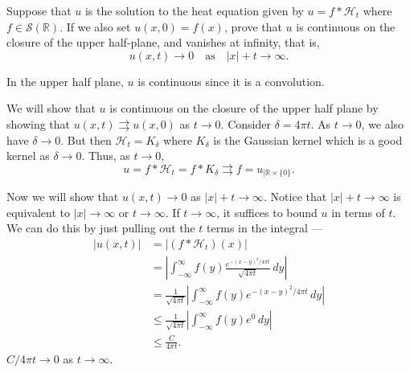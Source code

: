 \documentclass[12 pt, letterpaper]{hmcpset}
\begin{document}
\begin{problem}[S \& S \S 5.5 \#11]
	Suppose that $u$ is the solution to the heat equation given by $u = f * \mathcal{H}_{t}$ where $f \in \mathcal{S}(\mathbb{R})$. If we also set $u(x, 0) = f(x)$, prove that $u$ is continuous on the closure of the upper half-plane, and vanishes at infinity, that is,
	\[
		u(x, t) \to 0 \quad \text{as} \quad \lvert x \rvert + t \to \infty.
	\]
\end{problem}

\begin{solution}
	In the upper half plane, $u$ is continuous since it is a convolution.

	We will show that $u$ is continuous on the closure of the upper half plane by showing that $u(x, t) \rightrightarrows u(x, 0)$ as $t \to 0$. Consider $\delta = 4 \pi t$. As $t \to 0$, we also have $\delta \to 0$. But then $\mathcal{H}_{t}= K_{\delta}$ where $K_{\delta}$ is the Gaussian kernel which is a good kernel as $\delta \to 0$. Thus, as $t \to 0$,
	\[
		u = f * \mathcal{H}_{t} = f * K_{\delta} \rightrightarrows f = u_{| \mathbb{R} \times \{ 0 \}}.
	\]

	Now we will show that $u(x, t) \to 0$ as $\lvert x \rvert + t \to \infty$. Notice that $\lvert x \rvert + t \to \infty$ is equivalent to $\lvert x \rvert \to \infty$ or $t \to \infty$. If $t \to \infty$, it suffices to bound $u$ in terms of $t$. We can do this by just pulling out the $t$ terms in the integral ---
	\begin{align*}
		\lvert u(x, t) \rvert & = \lvert (f * \mathcal{H}_{t})(x) \rvert \\
				      & = \left \lvert \int_{-\infty}^{\infty} f(y) \frac{e^{-(x - y)^{2} / 4 \pi t}}{\sqrt{4 \pi t}} \, dy \right \rvert \\
				      & = \frac{1}{\sqrt{4 \pi t}} \left \lvert \int_{-\infty}^{\infty} f(y) e^{-(x - y)^{2} / 4 \pi t} \, dy \right \rvert \\
				      & \le \frac{1}{\sqrt{4 \pi t}} \left \lvert \int_{-\infty}^{\infty} f(y) e^{0} \, dy \right \rvert \\
				      & \le \frac{C}{4 \pi t}.
	\end{align*}
	$C / 4 \pi t \to 0$ as $t \to \infty$.


\end{solution}
\end{document}
